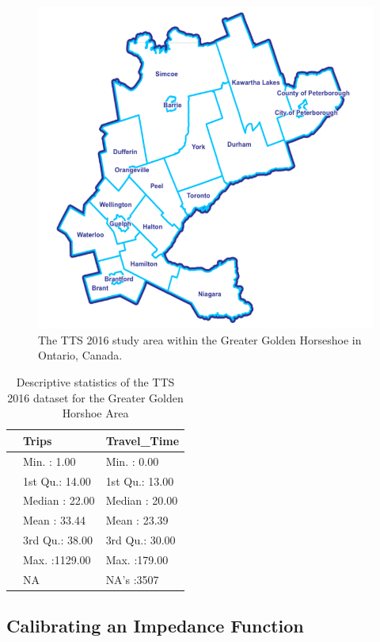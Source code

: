 \documentclass[]{elsarticle} %
\begin{document}
\begin{figure}

{\centering \includegraphics[width=0.7\linewidth]{images/Greater-Golden-Horseshoe-Map} 

}

\caption{\label{fig:TTS-16-survey-area}The TTS 2016 study area within the Greater Golden Horseshoe in Ontario, Canada.}\label{fig:TTS-16-survey-area}
\end{figure}

\begin{table}

\caption{\label{tab:unnamed-chunk-1}\label{tab:TTS-16-desc-stats}Descriptive statistics of the TTS 2016 dataset for the Greater Golden Horshoe Area}
\centering
\begin{tabular}[t]{l|l|l}
\hline
  & Trips & Travel\_Time\\
\hline
 & Min.   :   1.00 & Min.   :  0.00\\
\hline
 & 1st Qu.:  14.00 & 1st Qu.: 13.00\\
\hline
 & Median :  22.00 & Median : 20.00\\
\hline
 & Mean   :  33.44 & Mean   : 23.39\\
\hline
 & 3rd Qu.:  38.00 & 3rd Qu.: 30.00\\
\hline
 & Max.   :1129.00 & Max.   :179.00\\
\hline
 & NA & NA's   :3507\\
\hline
\end{tabular}
\end{table}

\hypertarget{calibrating-an-impedance-function}{%
\subsection{Calibrating an Impedance
Function}\label{calibrating-an-impedance-function}}
\end{document}
